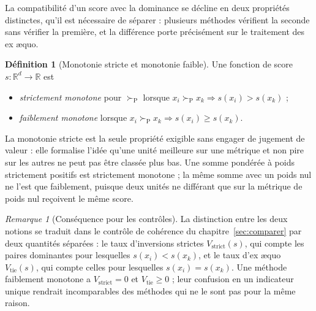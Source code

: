 \documentclass[11pt,a4paper]{article}
\theoremstyle{definition}
\newtheorem{definition}{Définition}[section]
\theoremstyle{remark}
\newtheorem{remarque}{Remarque}[section]
\newcommand{\R}{\mathbb{R}}
\newcommand{\pareto}{\succ_{\mathrm{P}}}
\begin{document}
\medskip

La compatibilité d'un score avec la dominance se décline en deux propriétés distinctes,
qu'il est nécessaire de séparer : plusieurs méthodes vérifient la seconde sans vérifier la
première, et la différence porte précisément sur le traitement des ex \ae quo.

\medskip

\begin{definition}[Monotonie stricte et monotonie faible]
  \label{def:monotonie}
  Une fonction de score $s : \R^d \to \R$ est

  \medskip

  \begin{itemize}[nosep,leftmargin=1.4em]
    \item \emph{strictement monotone} pour $\pareto$ lorsque
    $x_i \pareto x_k \Rightarrow s(x_i) > s(x_k)$ ;
    \item \emph{faiblement monotone} lorsque
    $x_i \pareto x_k \Rightarrow s(x_i) \ge s(x_k)$.
  \end{itemize}
\end{definition}

\bigskip

La monotonie stricte est la seule propriété exigible sans engager de jugement de valeur :
elle formalise l'idée qu'une unité meilleure sur une métrique et non pire sur les autres
ne peut pas être classée plus bas. Une somme pondérée à poids strictement positifs est
strictement monotone ; la même somme avec un poids nul ne l'est que faiblement, puisque
deux unités ne différant que sur la métrique de poids nul reçoivent le même score.

\medskip

\begin{remarque}[Conséquence pour les contrôles]
  \label{rem:monotonie-controle}
  La distinction entre les deux notions se traduit dans le contrôle de cohérence du
  chapitre~\ref{sec:comparer} par deux quantités séparées : le taux d'inversions strictes
  $V_{\mathrm{strict}}(s)$, qui compte les paires dominantes pour lesquelles
  $s(x_i) < s(x_k)$, et le taux d'ex \ae quo $V_{\mathrm{tie}}(s)$, qui compte celles pour
  lesquelles $s(x_i) = s(x_k)$. Une méthode faiblement monotone a
  $V_{\mathrm{strict}} = 0$ et $V_{\mathrm{tie}} \ge 0$ ; leur confusion en un indicateur
  unique rendrait incomparables des méthodes qui ne le sont pas pour la même raison.
\end{remarque}

\bigskip
\end{document}
